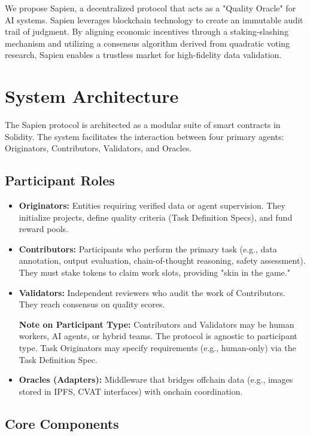 \documentclass[11pt, a4paper]{article}
\begin{document}
We propose Sapien, a decentralized protocol that acts as a "Quality Oracle" for AI systems. Sapien leverages blockchain technology to create an immutable audit trail of judgment. By aligning economic incentives through a staking-slashing mechanism and utilizing a consensus algorithm derived from quadratic voting research, Sapien enables a trustless market for high-fidelity data validation.

\section{System Architecture}

The Sapien protocol is architected as a modular suite of smart contracts in Solidity. The system facilitates the interaction between four primary agents: Originators, Contributors, Validators, and Oracles.

\subsection{Participant Roles}

\begin{itemize}
    \item \textbf{Originators:} Entities requiring verified data or agent supervision. They initialize projects, define quality criteria (Task Definition Specs), and fund reward pools.
    \item \textbf{Contributors:} Participants who perform the primary task (e.g., data annotation, output evaluation, chain-of-thought reasoning, safety assessment). They must stake tokens to claim work slots, providing "skin in the game."
    \item \textbf{Validators:} Independent reviewers who audit the work of Contributors. They reach consensus on quality scores.

    \textbf{Note on Participant Type:} Contributors and Validators may be human workers, AI agents, or hybrid teams. The protocol is agnostic to participant type. Task Originators may specify requirements (e.g., human-only) via the Task Definition Spec.
    \item \textbf{Oracles (Adapters):} Middleware that bridges offchain data (e.g., images stored in IPFS, CVAT interfaces) with onchain coordination.
\end{itemize}

\subsection{Core Components}
\end{document}
